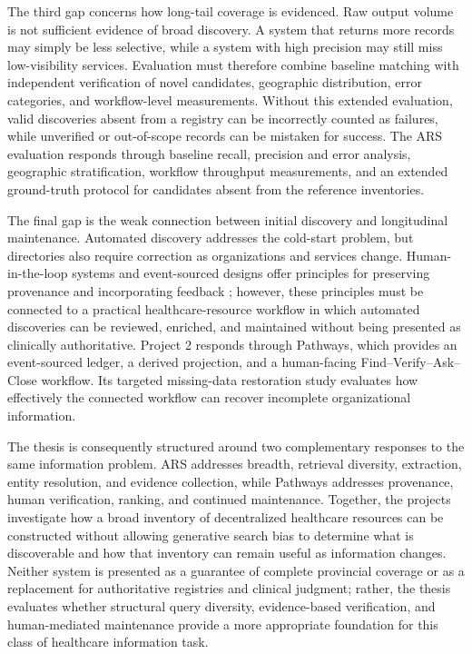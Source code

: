 \documentclass[12pt,oneside]{report}
\begin{document}
The third gap concerns how long-tail coverage is evidenced. Raw output volume is not sufficient evidence of broad discovery. A system that returns more records may simply be less selective, while a system with high precision may still miss low-visibility services. Evaluation must therefore combine baseline matching with independent verification of novel candidates, geographic distribution, error categories, and workflow-level measurements. Without this extended evaluation, valid discoveries absent from a registry can be incorrectly counted as failures, while unverified or out-of-scope records can be mistaken for success. The ARS evaluation responds through baseline recall, precision and error analysis, geographic stratification, workflow throughput measurements, and an extended ground-truth protocol for candidates absent from the reference inventories.

The final gap is the weak connection between initial discovery and longitudinal maintenance. Automated discovery addresses the cold-start problem, but directories also require correction as organizations and services change. Human-in-the-loop systems and event-sourced designs offer principles for preserving provenance and incorporating feedback \cite{47,48,55,56,57}; however, these principles must be connected to a practical healthcare-resource workflow in which automated discoveries can be reviewed, enriched, and maintained without being presented as clinically authoritative. Project 2 responds through Pathways, which provides an event-sourced ledger, a derived projection, and a human-facing Find--Verify--Ask--Close workflow. Its targeted missing-data restoration study evaluates how effectively the connected workflow can recover incomplete organizational information.

The thesis is consequently structured around two complementary responses to the same information problem. ARS addresses breadth, retrieval diversity, extraction, entity resolution, and evidence collection, while Pathways addresses provenance, human verification, ranking, and continued maintenance. Together, the projects investigate how a broad inventory of decentralized healthcare resources can be constructed without allowing generative search bias to determine what is discoverable and how that inventory can remain useful as information changes. Neither system is presented as a guarantee of complete provincial coverage or as a replacement for authoritative registries and clinical judgment; rather, the thesis evaluates whether structural query diversity, evidence-based verification, and human-mediated maintenance provide a more appropriate foundation for this class of healthcare information task.
\end{document}
